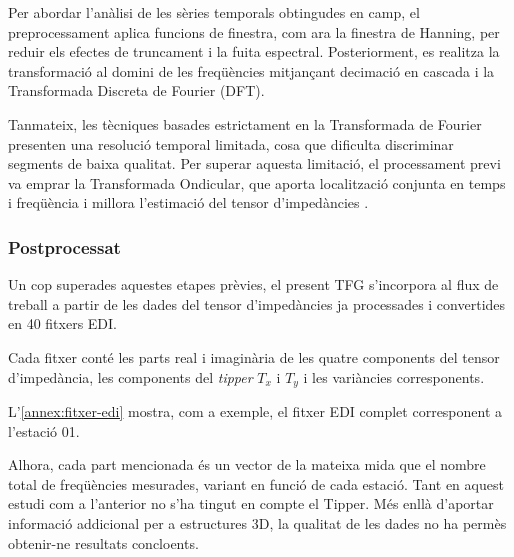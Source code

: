 \documentclass[11pt,a4paper,oneside]{article}
\begin{document}
\vspace{5pt}

Per abordar l'anàlisi de les sèries temporals obtingudes en camp, el preprocessament aplica funcions de finestra, com ara la finestra de Hanning, per reduir els efectes de truncament i la fuita espectral. Posteriorment, es realitza la transformació al domini de les freqüències mitjançant decimació en cascada i la Transformada Discreta de Fourier (DFT).

\vspace{5pt}

Tanmateix, les tècniques basades estrictament en la Transformada de Fourier presenten una resolució temporal limitada, cosa que dificulta discriminar segments de baixa qualitat. Per superar aquesta limitació, el processament previ va emprar la Transformada Ondicular, que aporta localització conjunta en temps i freqüència i millora l'estimació del tensor d'impedàncies .

\subsubsection{Postprocessat}

Un cop superades aquestes etapes prèvies, el present TFG s'incorpora al flux de treball a partir de les dades del tensor d'impedàncies ja processades i convertides en 40 fitxers EDI.

\vspace{5pt}

Cada fitxer conté les parts real i imaginària de les quatre components del tensor d’impedància, les components del \emph{tipper} $T_x$ i $T_y$ i les variàncies corresponents. 

\vspace{5pt}

L'\autoref{annex:fitxer-edi} mostra, com a exemple, el fitxer EDI complet
corresponent a l'estació 01.

\vspace{5pt}


Alhora, cada part mencionada és un vector de la mateixa mida que el nombre total de freqüències mesurades, variant en funció de cada estació. 
Tant en aquest estudi com a l’anterior \citep{arango2005} no s’ha tingut en compte el Tipper. Més enllà d’aportar informació addicional per a estructures 3D, la qualitat de les dades no ha permès obtenir-ne resultats concloents.

\vspace{5pt}
\end{document}
